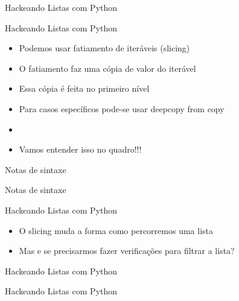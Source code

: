 \begin{frame}{Hackeando Listas com Python}
	\centering {}
	\lstset{language=Python}
	
	\textbf{}
\end{frame}

\begin{frame}{Hackeando Listas com Python}
\begin{itemize}
	\item 	Podemos usar fatiamento de iteráveis (slicing)
	\item 	O fatiamento faz uma cópia de valor do iterável
	\item 	Essa cópia é feita no primeiro nível
	\item 	Para casos específicos pode-se usar deepcopy from copy
	\item \textbf{}
	\item Vamos entender isso no quadro!!!
\end{itemize}
\end{frame}

\begin{frame}{Notas de sintaxe}
	\centering {}
	\lstset{language=Python}
	
\end{frame}

\begin{frame}{Notas de sintaxe}
\centering {}
\lstset{language=Python}

\end{frame}

\begin{frame}{Hackeando Listas com Python}
	\begin{itemize}
		\item 	O slicing muda a forma como percorremos uma lista
		\item 	Mas e se precisarmos fazer verificações para filtrar a lista?
	\end{itemize}
\end{frame}


\begin{frame}{Hackeando Listas com Python}
	\centering {}
	\lstset{language=Python}
	
\end{frame}

\begin{frame}{Hackeando Listas com Python}
	\centering {}
	\lstset{language=Python}
	
\end{frame}
